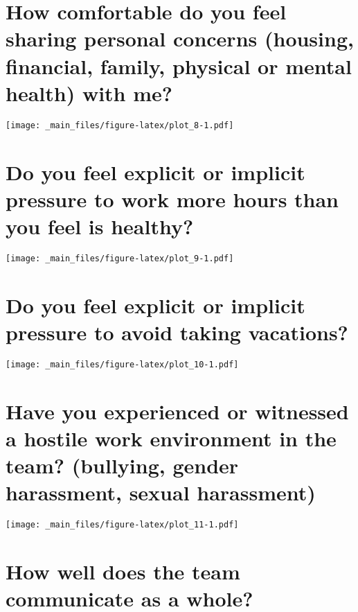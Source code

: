\documentclass[
]{book}
\begin{document}
\hypertarget{how-comfortable-do-you-feel-sharing-personal-concerns-housing-financial-family-physical-or-mental-health-with-me}{%
\section{How comfortable do you feel sharing personal concerns (housing, financial, family, physical or mental health) with me?}\label{how-comfortable-do-you-feel-sharing-personal-concerns-housing-financial-family-physical-or-mental-health-with-me}}

\texttt{[image: \_main\_files/figure-latex/plot\_8-1.pdf]}

\hypertarget{do-you-feel-explicit-or-implicit-pressure-to-work-more-hours-than-you-feel-is-healthy}{%
\section{Do you feel explicit or implicit pressure to work more hours than you feel is healthy?}\label{do-you-feel-explicit-or-implicit-pressure-to-work-more-hours-than-you-feel-is-healthy}}

\texttt{[image: \_main\_files/figure-latex/plot\_9-1.pdf]}

\hypertarget{do-you-feel-explicit-or-implicit-pressure-to-avoid-taking-vacations}{%
\section{Do you feel explicit or implicit pressure to avoid taking vacations?}\label{do-you-feel-explicit-or-implicit-pressure-to-avoid-taking-vacations}}

\texttt{[image: \_main\_files/figure-latex/plot\_10-1.pdf]}

\hypertarget{have-you-experienced-or-witnessed-a-hostile-work-environment-in-the-team-bullying-gender-harassment-sexual-harassment}{%
\section{Have you experienced or witnessed a hostile work environment in the team? (bullying, gender harassment, sexual harassment)}\label{have-you-experienced-or-witnessed-a-hostile-work-environment-in-the-team-bullying-gender-harassment-sexual-harassment}}

\texttt{[image: \_main\_files/figure-latex/plot\_11-1.pdf]}

\hypertarget{how-well-does-the-team-communicate-as-a-whole}{%
\section{How well does the team communicate as a whole?}\label{how-well-does-the-team-communicate-as-a-whole}}
\end{document}
